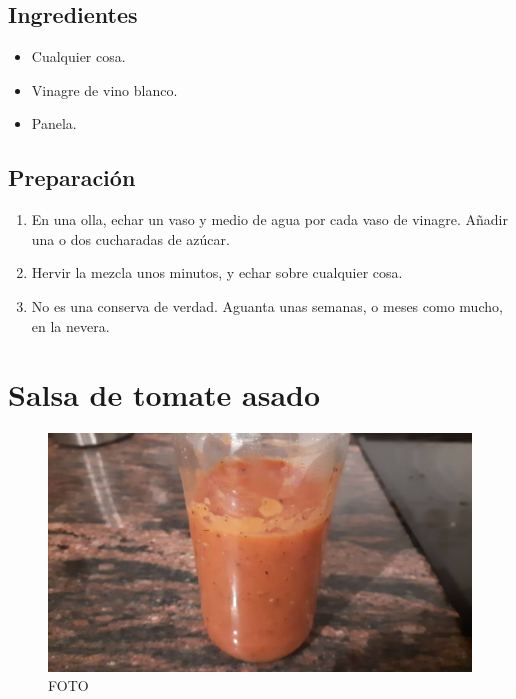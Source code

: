 \documentclass[
]{book}
\providecommand{\tightlist}{%
  \setlength{\itemsep}{0pt}\setlength{\parskip}{0pt}}
\begin{document}
\hypertarget{ingredientes-11}{%
\section*{Ingredientes}\label{ingredientes-11}}

\begin{itemize}
\tightlist
\item
  Cualquier cosa.
\item
  Vinagre de vino blanco.
\item
  Panela.
\end{itemize}

\hypertarget{preparaciuxf3n-11}{%
\section*{Preparación}\label{preparaciuxf3n-11}}

\begin{enumerate}
\def\labelenumi{\arabic{enumi}.}
\tightlist
\item
  En una olla, echar un vaso y medio de agua por cada vaso de vinagre. Añadir una o dos cucharadas de azúcar.
\item
  Hervir la mezcla unos minutos, y echar sobre cualquier cosa.
\item
  No es una conserva de verdad. Aguanta unas semanas, o meses como mucho, en la nevera.
\end{enumerate}

\hypertarget{salsa-de-tomate-asado}{%
\chapter{Salsa de tomate asado}\label{salsa-de-tomate-asado}}

\begin{figure}
\centering
\includegraphics{images/salsa-de-tomate-asado.jpg}
\caption{FOTO}
\end{figure}
\end{document}
